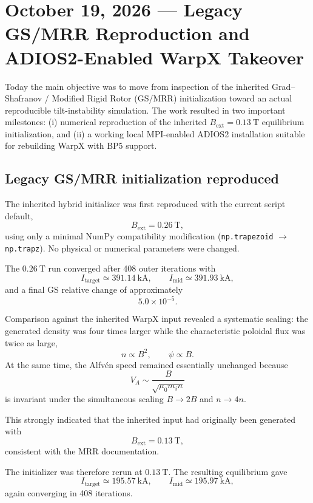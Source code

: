 \documentclass[11pt,a4paper]{article}
\begin{document}
\section{October 19, 2026 --- Legacy GS/MRR Reproduction and
ADIOS2-Enabled WarpX Takeover}

Today the main objective was to move from inspection of the inherited
Grad--Shafranov / Modified Rigid Rotor (GS/MRR) initialization toward an
actual reproducible tilt-instability simulation. The work resulted in two
important milestones: (i) numerical reproduction of the inherited
$B_{\mathrm{ext}}=0.13~\mathrm{T}$ equilibrium initialization, and
(ii) a working local MPI-enabled ADIOS2 installation suitable for rebuilding
WarpX with BP5 support.

\subsection{Legacy GS/MRR initialization reproduced}

The inherited hybrid initializer was first reproduced with the current script
default,
\[
B_{\mathrm{ext}} = 0.26~\mathrm{T},
\]
using only a minimal NumPy compatibility modification
(\texttt{np.trapezoid} $\rightarrow$ \texttt{np.trapz}). No physical or
numerical parameters were changed.

The $0.26~\mathrm{T}$ run converged after 408 outer iterations with
\[
I_{\mathrm{target}} \simeq 391.14~\mathrm{kA},
\qquad
I_{\mathrm{mid}} \simeq 391.93~\mathrm{kA},
\]
and a final GS relative change of approximately
\[
5.0\times10^{-5}.
\]

Comparison against the inherited WarpX input revealed a systematic scaling:
the generated density was four times larger while the characteristic
poloidal flux was twice as large,
\[
n \propto B^2,
\qquad
\psi \propto B.
\]
At the same time, the Alfv\'en speed remained essentially unchanged because
\[
V_A \sim \frac{B}{\sqrt{\mu_0 m_i n}}
\]
is invariant under the simultaneous scaling
$B\rightarrow2B$ and $n\rightarrow4n$.

This strongly indicated that the inherited input had originally been
generated with
\[
B_{\mathrm{ext}} = 0.13~\mathrm{T},
\]
consistent with the MRR documentation.

The initializer was therefore rerun at $0.13~\mathrm{T}$. The resulting
equilibrium gave
\[
I_{\mathrm{target}} \simeq 195.57~\mathrm{kA},
\qquad
I_{\mathrm{mid}} \simeq 195.97~\mathrm{kA},
\]
again converging in 408 iterations.
\end{document}
